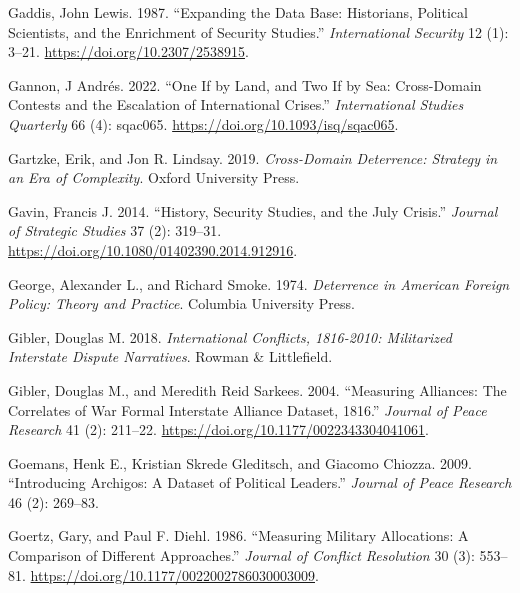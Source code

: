 \documentclass{article}
\newlength{\cslhangindent}
\newlength{\cslentryspacingunit} %
\newenvironment{CSLReferences}[2] %
 {%
  \setlength{\parindent}{0pt}
  \ifodd #1
  \let\oldpar\par
  \def\par{\hangindent=\cslhangindent\oldpar}
  \fi
  \setlength{\parskip}{#2\cslentryspacingunit}
 }%
 {}
\begin{document}
\begin{CSLReferences}{1}{0}
\leavevmode{}%
Gaddis, John Lewis. 1987. {``Expanding the {Data Base}: {Historians},
{Political Scientists}, and the {Enrichment} of {Security Studies}.''}
\emph{International Security} 12 (1): 3--21.
\url{https://doi.org/10.2307/2538915}.

\leavevmode{}%
Gannon, J Andrés. 2022. {``One If by {Land}, and {Two} If by {Sea}:
{Cross-Domain Contests} and the {Escalation} of {International
Crises}.''} \emph{International Studies Quarterly} 66 (4): sqac065.
\url{https://doi.org/10.1093/isq/sqac065}.

\leavevmode{}%
Gartzke, Erik, and Jon R. Lindsay. 2019. \emph{Cross-{Domain
Deterrence}: {Strategy} in an {Era} of {Complexity}}. {Oxford University
Press}.

\leavevmode{}%
Gavin, Francis J. 2014. {``History, {Security Studies}, and the {July
Crisis}.''} \emph{Journal of Strategic Studies} 37 (2): 319--31.
\url{https://doi.org/10.1080/01402390.2014.912916}.

\leavevmode{}%
George, Alexander L., and Richard Smoke. 1974. \emph{Deterrence in
{American} Foreign Policy: {Theory} and Practice}. {Columbia University
Press}.

\leavevmode{}%
Gibler, Douglas M. 2018. \emph{International {Conflicts}, 1816-2010:
{Militarized Interstate Dispute Narratives}}. {Rowman \& Littlefield}.

\leavevmode{}%
Gibler, Douglas M., and Meredith Reid Sarkees. 2004. {``Measuring
{Alliances}: The {Correlates} of {War Formal Interstate Alliance}
{Dataset}, 1816.''} \emph{Journal of Peace Research} 41
(2): 211--22. \url{https://doi.org/10.1177/0022343304041061}.

\leavevmode{}%
Goemans, Henk E., Kristian Skrede Gleditsch, and Giacomo Chiozza. 2009.
{``Introducing {Archigos}: {A} Dataset of Political Leaders.''}
\emph{Journal of Peace Research} 46 (2): 269--83.

\leavevmode{}%
Goertz, Gary, and Paul F. Diehl. 1986. {``Measuring {Military
Allocations}: {A Comparison} of {Different Approaches}.''} \emph{Journal
of Conflict Resolution} 30 (3): 553--81.
\url{https://doi.org/10.1177/0022002786030003009}.


\end{CSLReferences}
\end{document}
